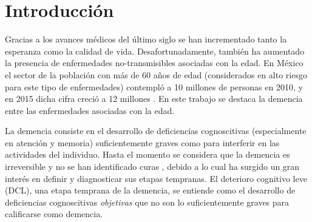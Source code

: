 \documentclass[12pt,letterpaper]{book}
\renewcommand{\headrulewidth}{0pt}
\begin{document}
\newpage

\setcounter{page}{1}


\pagestyle{fancy}
    \fancyhead[LO]{\sectionmark}
    \fancyhead[RE]{\chaptermark}
    \fancyfoot[CE,CO]{}
    \fancyfoot[LE,RO]{\thepage}
    \renewcommand{\headrulewidth}{1.5pt}


\chapter*{Introducción}

Gracias a los avances médicos del último siglo se han incrementado tanto la esperanza como la calidad de vida. 
%
Desafortunadamente, también ha aumentado la presencia de enfermedades no-transmisibles asociadas con la edad. 
%
En México el sector de la población con más de 60 años de edad (considerados en alto riesgo para este tipo de enfermedades) contempló a 10 millones de personas en 2010, y en 2015 dicha cifra creció a 12 millones \cite{Censo10,Intercensal15}.
%
En este trabajo se destaca la demencia entre las enfermedades asociadas con la edad.

La demencia consiste en el desarrollo de deficiencias cognoscitivas (especialmente en atención y memoria) suficientemente graves como para interferir en las actividades del individuo.
%
Hasta el momento se considera que la demencia es irreversible y no se han identificado curas \cite{PlanAlzheimer04}, debido a lo cual ha surgido un gran interés en definir y diagnosticar sus etapas tempranas.
%
El deterioro cognitivo leve (DCL), una etapa temprana de la demencia, se entiende como el desarrollo de deficiencias cognoscitivas \textit{objetivas} que no son lo suficientemente graves para calificarse como demencia.
\end{document}
